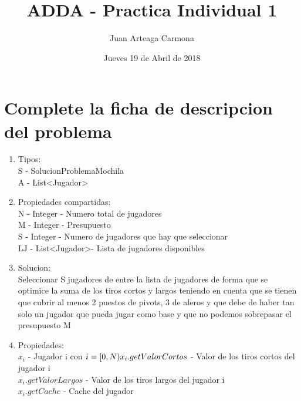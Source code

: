 \documentclass[a4paper,11pt]{article}
\title{ADDA - Practica Individual 1}
\author{Juan Arteaga Carmona}
\date{Jueves 19 de Abril de 2018}
\begin{document}
\maketitle

\section{Complete la ficha de descripcion del problema}


\begin{enumerate}
 \item Tipos:\\
 S - SolucionProblemaMochila\\
 A - List\textless Jugador\textgreater

 \item Propiedades compartidas:\\
 N - Integer - Numero total de jugadores\\
 M - Integer - Presupuesto\\
 S - Integer - Numero de jugadores que hay que seleccionar\\
 LJ - List\textless Jugador\textgreater - Lista de jugadores disponibles\\
 \item Solucion:\\
Seleccionar S jugadores de entre la lista de jugadores de forma que se optimice la suma de los tiros cortos y largos teniendo en cuenta que se tienen que cubrir al menos 2 puestos de pivots, 3 de aleros y que debe de haber tan solo un jugador que pueda jugar como base y que no podemos sobrepasar el presupuesto M


\item Propiedades:\\
\begin{math}
 x_i
\end{math}
- Jugador i con \begin{math}
                 i = [0,N)\\
x_i.getValorCortos
\end{math}
- Valor de los tiros cortos del jugador i\\
\begin{math}
x_i.getValorLargos
\end{math}
- Valor de los tiros largos del jugador i\\
 \begin{math}
 x_i.getCache
 \end{math}
 - Cache del jugador\\



\end{enumerate}
\end{document}
